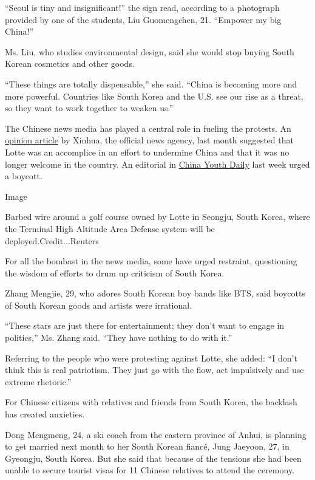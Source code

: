 ``Seoul is tiny and insignificant!'' the sign read, according to a
photograph provided by one of the students, Liu Guomengchen, 21.
``Empower my big China!''

Ms. Liu, who studies environmental design, said she would stop buying
South Korean cosmetics and other goods.

``These things are totally dispensable,'' she said. ``China is becoming
more and more powerful. Countries like South Korea and the U.S. see our
rise as a threat, so they want to work together to weaken us.''

The Chinese news media has played a central role in fueling the
protests. An
\href{http://news.xinhuanet.com/world/2017-02/27/c_1120539249.htm}{opinion
article} by Xinhua, the official news agency, last month suggested that
Lotte was an accomplice in an effort to undermine China and that it was
no longer welcome in the country. An editorial in
\href{http://article.cyol.com/news/content/2017-03/01/content_15679126.htm}{China
Youth Daily} last week urged a boycott.

Image

Barbed wire around a golf course owned by Lotte in Seongju, South Korea,
where the Terminal High Altitude Area Defense system will be
deployed.Credit...Reuters

For all the bombast in the news media, some have urged restraint,
questioning the wisdom of efforts to drum up criticism of South Korea.

Zhang Mengjie, 29, who adores South Korean boy bands like BTS, said
boycotts of South Korean goods and artists were irrational.

``These stars are just there for entertainment; they don't want to
engage in politics,'' Ms. Zhang said. ``They have nothing to do with
it.''

Referring to the people who were protesting against Lotte, she added:
``I don't think this is real patriotism. They just go with the flow, act
impulsively and use extreme rhetoric.''

For Chinese citizens with relatives and friends from South Korea, the
backlash has created anxieties.

Dong Mengmeng, 24, a ski coach from the eastern province of Anhui, is
planning to get married next month to her South Korean fiancé, Jung
Jaeyoon, 27, in Gyeongju, South Korea. But she said that because of the
tensions she had been unable to secure tourist visas for 11 Chinese
relatives to attend the ceremony.

